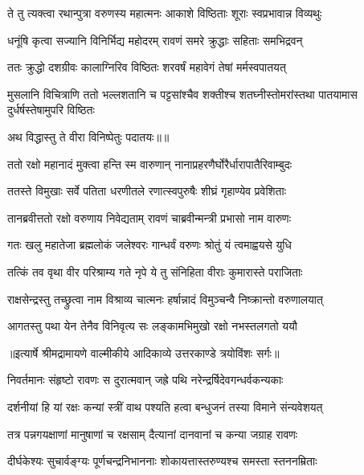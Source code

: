 \twolineshloka
{ते तु त्यक्त्वा रथान्पुत्रा वरुणस्य महात्मनः}
{आकाशे विष्ठिताः शूराः स्वप्रभावान्न विव्यथुः} %

\twolineshloka
{धनूंषि कृत्वा सज्यानि विनिर्भिद्य महोदरम्}
{रावणं समरे क्रुद्धाः सहिताः समभिद्रवन्} %

\twolineshloka
{ततः क्रुद्धो दशग्रीवः कालाग्निरिव विष्ठितः}
{शरवर्षं महावेगं तेषां मर्मस्वपातयत्} %

\threelineshloka
{मुसलानि विचित्राणि ततो भल्लशतानि च}
{पट्टसांश्चैव शक्तीश्च शतघ्नीस्तोमरांस्तथा}
{पातयामास दुर्धर्षस्तेषामुपरि विष्ठितः} %

{अथ विद्धास्तु ते वीरा विनिष्पेतुः पदातयः॥॥} %

\addtocounter{shlokacount}{1}

\twolineshloka
{ततो रक्षो महानादं मुक्त्वा हन्ति स्म वारुणान्}
{नानाप्रहरणैर्घोरैर्धारापातैरिवाम्बुदः} %

\twolineshloka
{ततस्ते विमुखाः सर्वे पतिता धरणीतले}
{रणात्स्वपुरुषैः शीघ्रं गृहाण्येव प्रवेशिताः} %

\twolineshloka
{तानब्रवीत्ततो रक्षो वरुणाय निवेद्यताम्}
{रावणं चाब्रवीन्मन्त्री प्रभासो नाम वारुणः} %

\twolineshloka
{गतः खलु महातेजा ब्रह्मलोकं जलेश्वरः}
{गान्धर्वं वरुणः श्रोतुं यं त्वमाह्वयसे युधि} %

\twolineshloka
{तत्किं तव वृथा वीर परिश्राम्य गते नृपे}
{ये तु संनिहिता वीराः कुमारास्ते पराजिताः} %

\twolineshloka
{राक्षसेन्द्रस्तु तच्छ्रुत्वा नाम विश्राव्य चात्मनः}
{हर्षान्नादं विमुञ्चन्वै निष्क्रान्तो वरुणालयात्} %

\twolineshloka
{आगतस्तु पथा येन तेनैव विनिवृत्य सः}
{लङ्कामभिमुखो रक्षो नभस्तलगतो ययौ} %


{॥इत्यार्षे श्रीमद्रामायणे वाल्मीकीये आदिकाव्ये उत्तरकाण्डे त्रयोविंशः सर्गः॥}


\twolineshloka
{निवर्तमानः संहृष्टो रावणः स दुरात्मवान्}
{जह्रे पथि नरेन्द्रर्षिदेवगन्धर्वकन्यकाः} %

\twolineshloka
{दर्शनीयां हि यां रक्षः कन्यां स्त्रीं वाथ पश्यति}
{हत्वा बन्धुजनं तस्या विमाने संन्यवेशयत्} %

\twolineshloka
{तत्र पन्नगयक्षाणां मानुषाणां च रक्षसाम्}
{दैत्यानां दानवानां च कन्या जग्राह रावणः} %

\twolineshloka
{दीर्घकेश्यः सुचार्वङ्ग्यः पूर्णचन्द्रनिभाननाः}
{शोकायत्तास्तरुण्यश्च समस्ता स्तननम्रिताः} %

